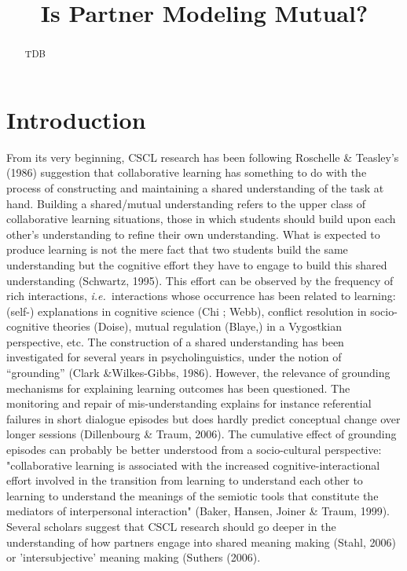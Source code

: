 \documentclass[twocolumn]{article}
\title{Is Partner Modeling Mutual?}
\newcommand{\ie}{{\textit{i.e.\ }}}
\begin{document}
\maketitle

\begin{abstract}
    TDB
\end{abstract}

\section{Introduction}


From its very beginning, CSCL research has been following Roschelle \& Teasley's
(1986) suggestion that collaborative learning has something to do with the
process of constructing and maintaining a shared understanding of the task at
hand. Building a shared/mutual understanding refers to the upper class of
collaborative learning situations, those in which students should build upon
each other's understanding to refine their own understanding. What is expected
to produce learning is not the mere fact that two students build the same
understanding but the cognitive effort they have to engage to build this shared
understanding (Schwartz, 1995). This effort can be observed by the frequency of
rich interactions, \ie interactions whose occurrence has been related to
learning: (self-) explanations in cognitive science (Chi ; Webb), conflict
resolution in socio-cognitive theories (Doise), mutual regulation (Blaye,) in a
Vygostkian perspective, etc. The construction of a shared understanding has been
investigated for several years in psycholinguistics, under the  notion of
“grounding” (Clark \&Wilkes-Gibbs, 1986). However, the relevance of grounding
mechanisms for explaining learning outcomes has been questioned. The monitoring
and repair of mis-understanding explains for instance referential failures in
short dialogue episodes but does hardly predict conceptual change over longer
sessions (Dillenbourg \& Traum, 2006). The cumulative effect of grounding
episodes can probably be better understood from a socio-cultural perspective:
"collaborative learning is associated with the increased cognitive-interactional
effort involved in the transition from learning to understand each other to
learning to understand the meanings of the semiotic tools that constitute the
mediators of interpersonal interaction" (Baker, Hansen, Joiner \& Traum, 1999).
Several scholars suggest that CSCL research should go deeper in the
understanding of how partners engage into shared meaning making (Stahl, 2006) or
'intersubjective' meaning making (Suthers (2006).  
\end{document}
